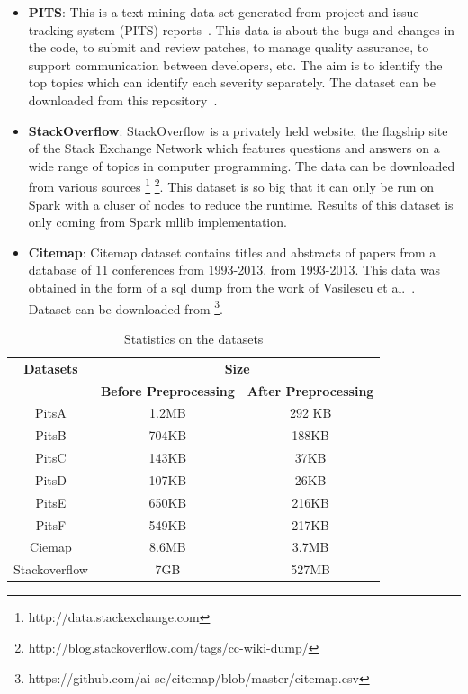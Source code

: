\documentclass[conference]{IEEEtran}
\theoremstyle{break}
\begin{document}
\begin{itemize}
    \item \textbf{PITS}: This is a text mining data set generated from project and issue tracking system (PITS) reports~\cite{menzies2008improving, menzies2008automated}. This data is about the bugs and changes in the code, to submit and review patches, to manage quality assurance, to support communication between developers, etc. The aim is to identify the top topics which can identify each severity separately. The dataset can be downloaded from this repository~\cite{promiserepo}. 
    
    \item \textbf{StackOverflow}: StackOverflow is a privately held website, the flagship site of the Stack Exchange Network which features questions and answers on a wide range of topics in computer programming. The data can be downloaded from various sources \footnote{http://data.stackexchange.com} \footnote{http://blog.stackoverflow.com/tags/cc-wiki-dump/}. This dataset is so big that it can only be run on Spark with a cluser of nodes to reduce the runtime. Results of this dataset is only coming from Spark mllib implementation.
    
    \item \textbf{Citemap}: Citemap dataset contains titles and abstracts of papers from a database of 11 conferences from 1993-2013. from 1993-2013. This data was obtained in the form of a sql dump from the work of Vasilescu et al.~\cite{vasilescu2013historical}. Dataset can be downloaded from \footnote{https://github.com/ai-se/citemap/blob/master/citemap.csv}. 
\end{itemize}

\begin{table}[H]
\begin{center}
\begin{tabular}{|c|c|c|}
        \hline 
        \textbf{Datasets} & \multicolumn{2}{|c|}{\textbf{Size}} \\ [0.5ex]
        \cline{2-3}
        & \textbf{Before Preprocessing} & \textbf{After Preprocessing}\\ [0.5ex]
        \hline
        PitsA & 1.2MB & 292 KB \\ [0.5ex]
        \hline
        PitsB & 704KB & 188KB \\ [0.5ex]
        \hline
        PitsC & 143KB & 37KB \\ [0.5ex]
        \hline
        PitsD & 107KB & 26KB \\ [0.5ex]
        \hline
        PitsE & 650KB & 216KB \\ [0.5ex]
        \hline
        PitsF & 549KB & 217KB \\ [0.5ex]
        \hline
        Ciemap & 8.6MB & 3.7MB \\ [0.5ex]
        \hline
        Stackoverflow & 7GB & 527MB \\ [0.5ex]
        \hline
\end{tabular}
\end{center}
\caption{Statistics on the datasets}
\label{tb:dataset}
\end{table}
\end{document}
